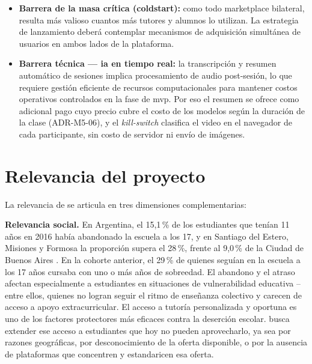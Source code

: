 \begin{itemize}
          carecían de ella-- sigue existiendo un
          segmento de la población, especialmente en contextos de bajos
          recursos, que no puede acceder a estos servicios ni cuenta con
          dispositivos adecuados. Esta realidad puede limitar el alcance
          efectivo de la plataforma en los contextos donde el impacto
          social sería mayor, y debe ser considerada en el diseño de la
          experiencia de usuario.
    \item \textbf{Barrera de la masa crítica (\gls{coldstart}):} como todo
          \gls{marketplace} bilateral, \sistema{} resulta más valioso
          cuantos más tutores y alumnos lo utilizan. La estrategia de
          lanzamiento deberá contemplar mecanismos de adquisición
          simultánea de usuarios en ambos lados de la plataforma.
    \item \textbf{Barrera técnica --- \gls{ia} en tiempo real:} la
          transcripción y resumen automático de sesiones implica
          procesamiento de audio post-sesión, lo que requiere gestión
          eficiente de recursos computacionales para mantener costos
          operativos controlados en la fase de \gls{mvp}. Por eso el
          resumen se ofrece como adicional pago cuyo precio cubre el
          costo de los modelos según la duración de la clase
          (ADR-M5-06), y el \emph{kill-switch} clasifica el video en el
          navegador de cada participante, sin costo de servidor ni envío
          de imágenes.
\end{itemize}

\section{Relevancia del proyecto}\label{sec:relevancia}

La relevancia de \sistema{} se articula en tres dimensiones
complementarias:

\textbf{Relevancia social.} En Argentina, el 15,1\,\% de los
estudiantes que tenían 11 años en 2016 había abandonado la escuela a los
17, y en Santiago del Estero, Misiones y Formosa la proporción supera el
28\,\%, frente al 9,0\,\% de la Ciudad de Buenos Aires
\citep{miguez2023}. En la cohorte anterior, el 29\,\% de quienes seguían
en la escuela a los 17 años cursaba con uno o más años de sobreedad. El
abandono y el atraso afectan especialmente a estudiantes en situaciones
de vulnerabilidad educativa --entre ellos, quienes no logran seguir el
ritmo de enseñanza colectivo y carecen de acceso a apoyo
extracurricular. El acceso a tutoría personalizada y oportuna es uno de
los factores protectores más eficaces contra la deserción escolar.
\sistema{} busca extender ese acceso a estudiantes que hoy no pueden
aprovecharlo, ya sea por razones geográficas, por desconocimiento de la
oferta disponible, o por la ausencia de plataformas que concentren y
estandaricen esa oferta.

